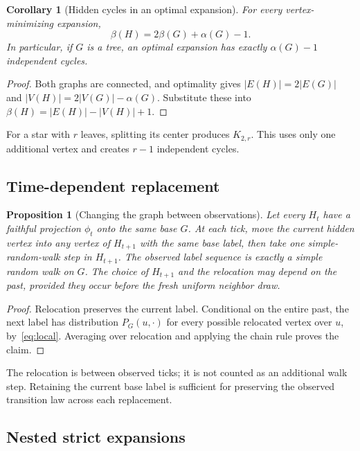 \documentclass[11pt]{article}
\newtheorem{proposition}[theorem]{Proposition}
\newtheorem{corollary}[theorem]{Corollary}
\theoremstyle{definition}
\numberwithin{equation}{section}
\newcommand{\V}{V}
\newcommand{\E}{E}
\begin{document}
\begin{corollary}[Hidden cycles in an optimal expansion]
For every vertex-minimizing expansion,
\[
 \beta(H)=2\beta(G)+\alpha(G)-1.
\]
In particular, if $G$ is a tree, an optimal expansion has exactly
$\alpha(G)-1$ independent cycles.
\end{corollary}
\begin{proof}
Both graphs are connected, and optimality gives
$|\E(H)|=2|\E(G)|$ and $|\V(H)|=2|\V(G)|-\alpha(G)$.
Substitute these into $\beta(H)=|\E(H)|-|\V(H)|+1$.
\end{proof}

For a star with $r$ leaves, splitting its center produces $K_{2,r}$.
This uses only one additional vertex and creates $r-1$ independent cycles.

\subsection{Time-dependent replacement}

\begin{proposition}[Changing the graph between observations]\label{prop:dynamic}
Let every $H_t$ have a faithful projection $\phi_t$ onto the same base $G$.
At each tick, move the current hidden vertex into any vertex of $H_{t+1}$
with the same base label, then take one simple-random-walk step in $H_{t+1}$.
The observed label sequence is exactly a simple random walk on $G$.
The choice of $H_{t+1}$ and the relocation may depend on the past, provided
they occur before the fresh uniform neighbor draw.
\end{proposition}
\begin{proof}
Relocation preserves the current label. Conditional on the entire past,
the next label has distribution $P_G(u,\cdot)$ for every possible relocated
vertex over $u$, by~\eqref{eq:local}. Averaging over relocation and applying
the chain rule proves the claim.
\end{proof}

The relocation is between observed ticks; it is not counted as an additional
walk step. Retaining the current base label is sufficient for preserving the
observed transition law across each replacement.

\subsection{Nested strict expansions}
\end{document}
